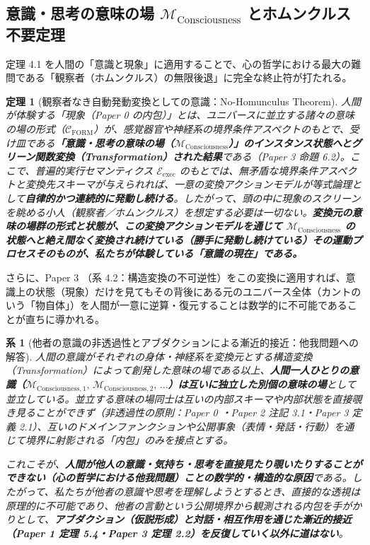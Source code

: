 \documentclass[11pt,a4paper]{ltjsarticle}
\theoremstyle{definition}
\theoremstyle{plain}
\newtheorem{theorem}{定理}[section]
\newtheorem{corollary}{系}[section]
\begin{document}
\subsection{意識・思考の意味の場 $\mathcal{M}_{\mathrm{Consciousness}}$ とホムンクルス不要定理}
定理 4.1 を人間の「意識と現象」に適用することで、心の哲学における最大の難問である「観察者（ホムンクルス）の無限後退」に完全な終止符が打たれる。

\begin{theorem}[観察者なき自動発動変換としての意識：No-Homunculus Theorem]
人間が体験する「現象（Paper 0 \cite{Ota2026_0} の内包）」とは、ユニバースに並立する諸々の意味の場の形式（$\mathcal{C}_{\mathrm{FORM}}$）が、感覚器官や神経系の境界条件アスペクトのもとで、受け皿である\textbf{「意識・思考の意味の場（$\mathcal{M}_{\mathrm{Consciousness}}$）」のインスタンス状態へとグリーン関数変換（Transformation）された結果}である（Paper 3 \cite{Ota2026_3} 命題 6.2）。ここで、普遍的実行セマンティクス $\mathcal{E}_{\mathrm{exec}}$ のもとでは、無矛盾な境界条件アスペクトと変換先スキーマが与えられれば、一意の変換アクションモデルが等式論理として\textbf{自律的かつ連続的に発動し続ける}。したがって、頭の中に現象のスクリーンを眺める小人（観察者／ホムンクルス）を想定する必要は一切ない。\textbf{変換元の意味の場群の形式と状態が、この変換アクションモデルを通じて $\mathcal{M}_{\mathrm{Consciousness}}$ の状態へと絶え間なく変換され続けている（勝手に発動し続けている）その運動プロセスそのものが、私たちが体験している「意識の現在」である。}
\end{theorem}

さらに、Paper 3 \cite{Ota2026_3}（系 4.2：構造変換の不可逆性）をこの変換に適用すれば、意識上の状態（現象）だけを見てもその背後にある元のユニバース全体（カントのいう「物自体」\cite{Kant1781}）を人間が一意に逆算・復元することは数学的に不可能であることが直ちに導かれる。

\begin{corollary}[他者の意識の非透過性とアブダクションによる漸近的接近：他我問題への解答]
人間の意識がそれぞれの身体・神経系を変換元とする構造変換（Transformation）によって創発した意味の場である以上、\textbf{人間一人ひとりの意識（$\mathcal{M}_{\mathrm{Consciousness}, 1},\, \mathcal{M}_{\mathrm{Consciousness}, 2},\, \dots$）は互いに独立した別個の意味の場}として並立している。並立する意味の場同士は互いの内部スキーマや内部状態を直接覗き見ることができず（非透過性の原則：Paper 0 \cite{Ota2026_0}・Paper 2 \cite{Ota2026_2} 注記 3.1・Paper 3 \cite{Ota2026_3} 定義 2.1）、互いのドメインファンクションや公開事象（表情・発話・行動）を通じて境界に射影される「内包」のみを接点とする。

これこそが、\textbf{人間が他人の意識・気持ち・思考を直接見たり覗いたりすることができない（心の哲学における他我問題）ことの数学的・構造的な原因}である。したがって、私たちが他者の意識や思考を理解しようとするとき、直接的な透視は原理的に不可能であり、他者の言動という公開境界から観測される内包を手がかりとして、\textbf{アブダクション（仮説形成）と対話・相互作用を通じた漸近的接近（Paper 1 \cite{Ota2026_1} 定理 5.4・Paper 3 \cite{Ota2026_3} 定理 2.2）を反復していく以外に道はない}。
\end{corollary}
\end{document}

